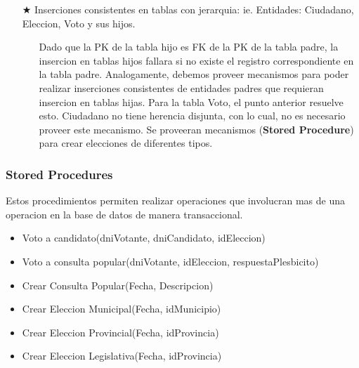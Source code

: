 \begin{itemize}
	\item[$\bigstar$] Inserciones consistentes en tablas con jerarquia: ie. Entidades: Ciudadano, Eleccion, Voto y sus hijos. 
	\begin{itemize}
		\item[\Checkmark] Dado que la PK de la tabla hijo es FK de la PK de la tabla padre, la insercion en tablas hijos fallara si no existe el registro correspondiente en la tabla padre. Analogamente, debemos proveer mecanismos para poder realizar inserciones consistentes de entidades padres que requieran insercion en tablas hijas. Para la tabla Voto, el punto anterior resuelve esto. Ciudadano no tiene herencia disjunta, con lo cual, no es necesario proveer este mecanismo. Se proveeran mecanismos (\textbf{Stored Procedure}) para crear elecciones de diferentes tipos. 
	\end{itemize}
\end{itemize}

\subsubsection{Stored Procedures}
Estos procedimientos permiten realizar operaciones que involucran mas de una operacion en la base de datos de manera transaccional.
\begin{itemize}
	\item Voto a candidato(dniVotante, dniCandidato, idEleccion)
	\item Voto a consulta popular(dniVotante, idEleccion, respuestaPlesbicito)
	\item Crear Consulta Popular(Fecha, Descripcion)
	\item Crear Eleccion Municipal(Fecha, idMunicipio)
	\item Crear Eleccion Provincial(Fecha, idProvincia)
	\item Crear Eleccion Legislativa(Fecha, idProvincia)
\end{itemize}